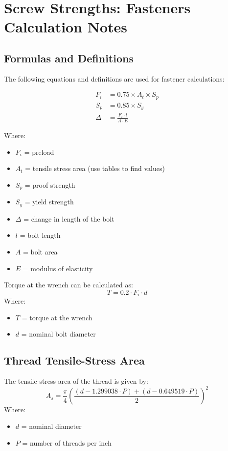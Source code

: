 \section*{Screw Strengths: Fasteners Calculation Notes}

\subsection*{Formulas and Definitions}
The following equations and definitions are used for fastener calculations:

\begin{align*}
    F_i &= 0.75 \times A_t \times S_p \\
    S_p &= 0.85 \times S_y \\
    \Delta &= \frac{F_i \cdot l}{A \cdot E}
\end{align*}

Where:
\begin{itemize}
    \item $F_i$ = preload
    \item $A_t$ = tensile stress area (use tables to find values)
    \item $S_p$ = proof strength
    \item $S_y$ = yield strength
    \item $\Delta$ = change in length of the bolt
    \item $l$ = bolt length
    \item $A$ = bolt area
    \item $E$ = modulus of elasticity
\end{itemize}

Torque at the wrench can be calculated as:
\[
T = 0.2 \cdot F_i \cdot d
\]
Where:
\begin{itemize}
    \item $T$ = torque at the wrench
    \item $d$ = nominal bolt diameter
\end{itemize}

\subsection*{Thread Tensile-Stress Area}
The tensile-stress area of the thread is given by:
\[
A_s = \frac{\pi}{4} \left( \frac{(d - 1.299038 \cdot P) + (d - 0.649519 \cdot P)}{2} \right)^2
\]
Where:
\begin{itemize}
    \item $d$ = nominal diameter
    \item $P$ = number of threads per inch
\end{itemize}

